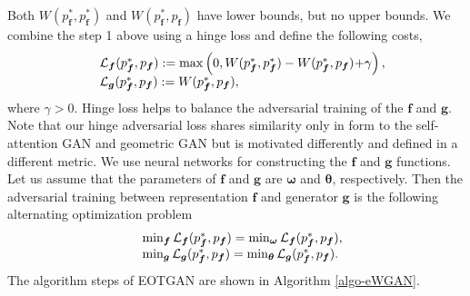 Both $W(p^{\ast}_{\bm{f}}, p^{\ast}_{\bm{f}})$ and $W(p^{\ast}_{\bm{f}}, p_{\bm{f}})$ have lower bounds, but no upper bounds. 
We combine the step 1 above using a hinge loss and define the following costs,
\begin{equation}
  \begin{array}{rl}
    &\mathcal{L}_{\bm{f}}(p^{\ast}_{\bm{f}}, p_{\bm{f}}) := \max\left(0, W(p^{\ast}_{\bm{f}}, p^{\ast}_{\bm{f}})- W(p^{\ast}_{\bm{f}}, p_{\bm{f}}) \hspace{-2pt}+\hspace{-2pt} \gamma \right),\\
    &\mathcal{L}_{\bm{g}}(p^{\ast}_{\bm{f}}, p_{\bm{f}}) := W(p^{\ast}_{\bm{f}}, p_{\bm{f}}),
  \end{array}
\end{equation}
where $\gamma>0$. Hinge loss helps to balance the adversarial training of the $\bm{f}$ and $\bm{g}$.
Note that our hinge adversarial loss shares similarity only in form to the self-attention GAN\cite{2018arXiv180508318Z} and geometric GAN\cite{2017arXiv170502894L} but is motivated differently and defined in a different metric. We use neural networks for constructing the $\bm{f}$ and $\bm{g}$ functions. Let us assume that the parameters of $\bm{f}$ and $\bm{g}$ are $\bm{\omega}$ and $\bm{\theta}$, respectively. Then the adversarial training between representation $\bm{f}$ and
generator $\bm{g}$ is the following alternating optimization problem
\begin{equation}
  \begin{array}{rl}
    &\min_{\bm{f}} \Ll_{\bm{f}}(p^{\ast}_{\bm{f}}, p_{\bm{f}}) = \min_{\bm{\omega}} \Ll_{\bm{f}}(p^{\ast}_{\bm{f}}, p_{\bm{f}}), \\ 
    &\min_{\bm{g}}\Ll_{\bm{g}}(p^{\ast}_{\bm{f}}, p_{\bm{f}}) = \min_{\bm{\th}}\Ll_{\bm{g}}(p^{\ast}_{\bm{f}}, p_{\bm{f}}).
  \end{array}\vspace{-2pt}
\end{equation}
The algorithm steps of EOTGAN are shown in Algorithm \ref{algo-eWGAN}.

